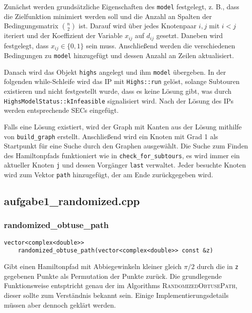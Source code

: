 \documentclass[a4paper, 10pt, ngerman]{article}
\begin{document}
Zunächst werden grundsätzliche Eigenschaften des \verb|model| festgelegt, z. B., dass die Zielfunktion minimiert werden soll und die Anzahl an Spalten der Bedingungsmatrix $\binom n 2$ ist. Darauf wird über jedes Knotenpaar $i, j$ mit $i < j$ iteriert und der Koeffizient der Variable $x_{ij}$ auf $d_{ij}$ gesetzt. Daneben wird festgelegt, dass $x_{ij} \in \{0, 1\}$ sein muss. Anschließend werden die verschiedenen Bedingungen zu \verb|model| hinzugefügt und dessen Anzahl an Zeilen aktualisiert.

Danach wird das Objekt \verb|highs| angelegt und ihm \verb|model| übergeben. In der folgenden while-Schleife wird das IP mit \verb|Highs::run| gelöst, solange Subtouren existieren und nicht festgestellt wurde, dass es keine Lösung gibt, was durch \verb|HighsModelStatus::kInfeasible| signalisiert wird. Nach der Lösung des IPs werden entsprechende SECs eingefügt.

Falls eine Lösung existiert, wird der Graph mit Kanten aus der Lösung mithilfe von \verb|build_graph| erstellt. Anschließend wird ein Knoten mit Grad 1 als Startpunkt für eine Suche durch den Graphen ausgewählt. Die Suche zum Finden des Hamiltonpfads funktioniert wie in \verb|check_for_subtours|, es wird immer ein aktueller Knoten \verb|j| und dessen Vorgänger \verb|last| verwaltet. Jeder besuchte Knoten wird zum Vektor \verb|path| hinzugefügt, der am Ende zurückgegeben wird.

\subsection{aufgabe1\_randomized.cpp}

\subsubsection{randomized\_obtuse\_path}

\verb|vector<complex<double>>| \\
\verb|    randomized_obtuse_path(vector<complex<double>> const &z)|
\medskip

\noindent Gibt einen Hamiltonpfad mit Abbiegewinkeln kleiner gleich $\pi / 2$ durch die in \verb|z| gegebenen Punkte als Permutation der Punkte zurück. Die grundlegende Funktionsweise entsptricht genau der im Algorithms \textsc{RandomizedObtusePath}, dieser sollte zum Verständnis bekannt sein. Einige Implementierungsdetails müssen aber dennoch geklärt werden.
\end{document}
